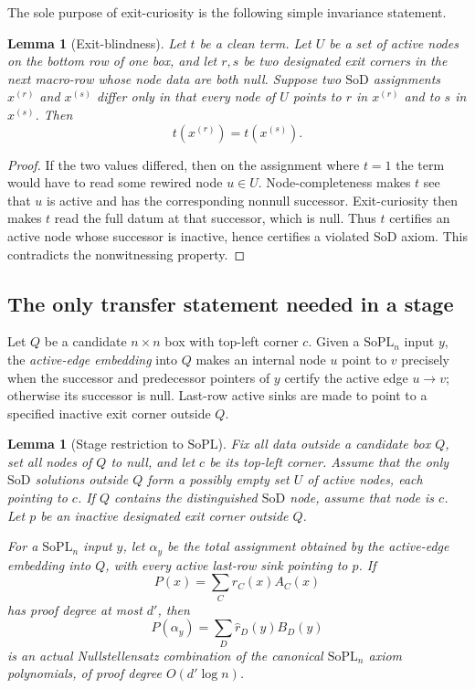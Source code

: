 \documentclass[11pt]{article}
\newtheorem{lemma}[theorem]{Lemma}
\theoremstyle{definition}
\newcommand{\SoPL}{\mathrm{SoPL}}
\newcommand{\SoD}{\mathrm{SoD}}
\begin{document}
The sole purpose of exit-curiosity is the following simple invariance statement.

\begin{lemma}[Exit-blindness]\label{lem:exit-blindness}
Let $t$ be a clean term.  Let $U$ be a set of active nodes on the bottom row of one
box, and let $r,s$ be two designated exit corners in the next macro-row whose node
data are both null.  Suppose two $\SoD$ assignments $x^{(r)}$ and $x^{(s)}$ differ
only in that every node of $U$ points to $r$ in $x^{(r)}$ and to $s$ in $x^{(s)}$.
Then
\[
  t(x^{(r)})=t(x^{(s)}).
\]
\end{lemma}

\begin{proof}
If the two values differed, then on the assignment where $t=1$ the term would have to
read some rewired node $u\in U$.  Node-completeness makes $t$ see that $u$ is active
and has the corresponding nonnull successor.  Exit-curiosity then makes $t$ read the
full datum at that successor, which is null.  Thus $t$ certifies an active node whose
successor is inactive, hence certifies a violated $\SoD$ axiom.  This contradicts the
nonwitnessing property.
\end{proof}

\subsection{The only transfer statement needed in a stage}

Let $Q$ be a candidate $n\times n$ box with top-left corner $c$.  Given a $\SoPL_n$
input $y$, the \emph{active-edge embedding} into $Q$ makes an internal node $u$ point
to $v$ precisely when the successor and predecessor pointers of $y$ certify the active
edge $u\to v$; otherwise its successor is null.  Last-row active sinks are made to
point to a specified inactive exit corner outside $Q$.

\begin{lemma}[Stage restriction to $\SoPL$]\label{lem:stage-restriction}
Fix all data outside a candidate box $Q$, set all nodes of $Q$ to null, and let $c$ be
its top-left corner.  Assume that the only $\SoD$ solutions outside $Q$ form a
possibly empty set $U$ of active nodes, each pointing to $c$.  If $Q$ contains the
distinguished $\SoD$ node, assume that node is $c$.  Let $p$ be an inactive designated
exit corner outside $Q$.

For a $\SoPL_n$ input $y$, let $\alpha_y$ be the total assignment obtained by the
active-edge embedding into $Q$, with every active last-row sink pointing to $p$.  If
\[
  P(x)=\sum_C r_C(x)A_C(x)
\]
has proof degree at most $d'$, then
\[
  P(\alpha_y)=\sum_D \widehat r_D(y)B_D(y)
  \tag{6.1}\label{eq:stage-restriction}
\]
is an actual Nullstellensatz combination of the canonical $\SoPL_n$ axiom
polynomials, of proof degree $O(d'\log n)$.
\end{lemma}
\end{document}
